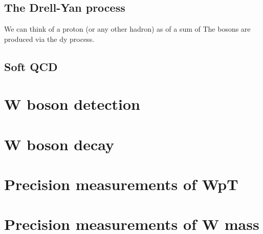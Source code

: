 		\subsection{The Drell-Yan process}
		We can think of a proton (or any other hadron) as of a sum of 
		The bosons are produced via the \gls{dy} process. 
		\subsection{Soft QCD}
		
        \section{W boson detection}
        
		\section{W boson decay }

        \section{Precision measurements of WpT }

		\section{Precision measurements of W mass }


